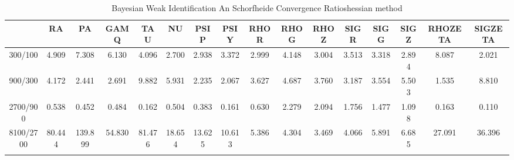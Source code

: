 \documentclass[a4paper,10pt]{article}
\begin{document}
\centering
\begin{longtable}{cccccccccccccccc}
\toprule
 & RA & PA & GAMQ & TAU & NU & PSIP & PSIY & RHOR & RHOG & RHOZ & SIGR & SIGG & SIGZ & RHOZETA & SIGZETA \\
\midrule
300/100 & 4.909 & 7.308 & 6.130 & 4.096 & 2.700 & 2.938 & 3.372 & 2.999 & 4.148 & 3.004 & 3.513 & 3.318 & 2.894 & 8.087 & 2.021 \\
900/300 & 4.172 & 2.441 & 2.691 & 9.882 & 5.931 & 2.235 & 2.067 & 3.627 & 4.687 & 3.760 & 3.187 & 3.554 & 5.503 & 1.535 & 8.810 \\
2700/900 & 0.538 & 0.452 & 0.484 & 0.162 & 0.504 & 0.383 & 0.161 & 0.630 & 2.279 & 2.094 & 1.756 & 1.477 & 1.098 & 0.163 & 0.110 \\
8100/2700 & 80.444 & 139.899 & 54.830 & 81.476 & 18.654 & 13.625 & 10.613 & 5.386 & 4.304 & 3.469 & 4.066 & 5.891 & 6.685 & 27.091 & 36.396 \\
\bottomrule
\caption{Bayesian Weak Identification An Schorfheide Convergence Ratioshessian method}
\label{table:tbl:WeakAnSchoConvergenceRatios_hessian}
\end{longtable}
\end{document}
